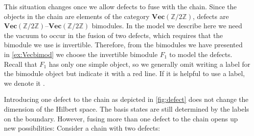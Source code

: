 {This situation changes once we allow defects to fuse with the chain. Since the objects in the chain are elements of the category $\mathbf{Vec}(\mathbb{Z}/2\mathbb{Z})$, defects are $\mathbf{Vec}(\mathbb{Z}/2\mathbb{Z})$--$\mathbf{Vec}(\mathbb{Z}/2\mathbb{Z})$ bimodules. In the model we describe here we need the vacuum to occur in the fusion of two defects, which requires that the bimodule we use is invertible. 
Therefore, from the bimodules we have presented in \cref{ex:Vecbimod} we choose the invertible bimodule $F_1$ to model the defects. Recall that $F_1$ has only one simple object, so we generally omit writing a label for the bimodule object but indicate it with a red line. If it is helpful to use a label, we denote it \textasteriskcentered. 

Introducing one defect to the chain as depicted in \cref{fig:defect} does not change the dimension of the Hilbert space. The basis states are still determined by the labels on the boundary. However, fusing more than one defect to the chain opens up new possibilities: Consider a chain with two defects:

}
